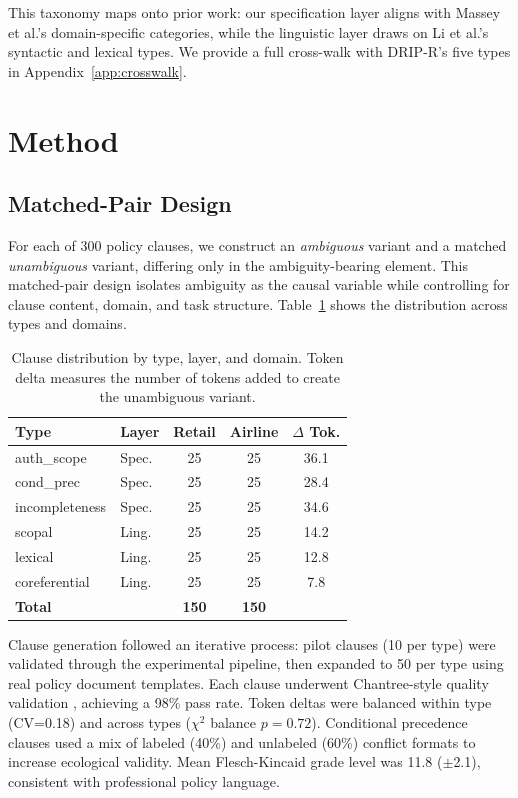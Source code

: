 \documentclass[11pt,a4paper]{article}
\begin{document}
This taxonomy maps onto prior work: our specification layer aligns with Massey et al.'s domain-specific categories, while the linguistic layer draws on Li et al.'s syntactic and lexical types. We provide a full cross-walk with DRIP-R's five types in Appendix~\ref{app:crosswalk}.

\section{Method}

\subsection{Matched-Pair Design}

For each of 300 policy clauses, we construct an \textit{ambiguous} variant and a matched \textit{unambiguous} variant, differing only in the ambiguity-bearing element. This matched-pair design isolates ambiguity as the causal variable while controlling for clause content, domain, and task structure. Table~\ref{tab:clause_dist} shows the distribution across types and domains.

\begin{table}[t]
\centering
\small
\caption{Clause distribution by type, layer, and domain. Token delta measures the number of tokens added to create the unambiguous variant.}
\label{tab:clause_dist}
\begin{tabular}{llccc}
\toprule
\textbf{Type} & \textbf{Layer} & \textbf{Retail} & \textbf{Airline} & \textbf{$\Delta$ Tok.} \\
\midrule
auth\_scope & Spec. & 25 & 25 & 36.1 \\
cond\_prec & Spec. & 25 & 25 & 28.4 \\
incompleteness & Spec. & 25 & 25 & 34.6 \\
scopal & Ling. & 25 & 25 & 14.2 \\
lexical & Ling. & 25 & 25 & 12.8 \\
coreferential & Ling. & 25 & 25 & 7.8 \\
\midrule
\textbf{Total} & & \textbf{150} & \textbf{150} & \\
\bottomrule
\end{tabular}
\end{table}

Clause generation followed an iterative process: pilot clauses (10 per type) were validated through the experimental pipeline, then expanded to 50 per type using real policy document templates. Each clause underwent Chantree-style quality validation \cite{chantree2006identifying}, achieving a 98\% pass rate. Token deltas were balanced within type (CV=0.18) and across types ($\chi^2$ balance $p=0.72$). Conditional precedence clauses used a mix of labeled (40\%) and unlabeled (60\%) conflict formats to increase ecological validity. Mean Flesch-Kincaid grade level was 11.8 ($\pm$2.1), consistent with professional policy language.
\end{document}
